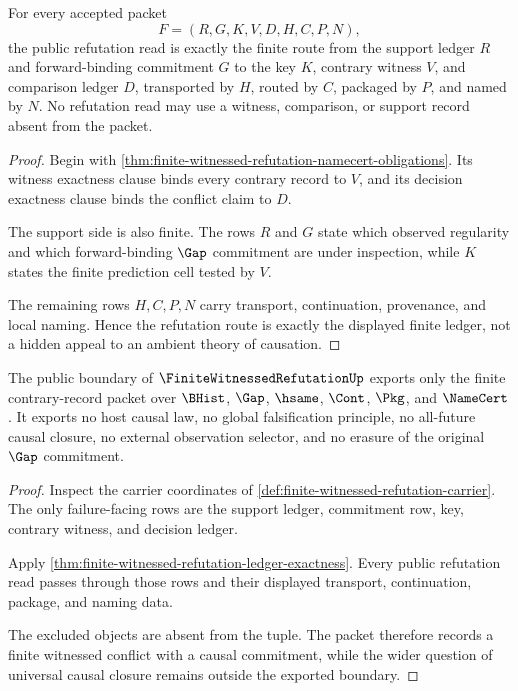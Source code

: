 \begin{theorem}
\label{thm:finite-witnessed-refutation-ledger-exactness}
For every accepted packet
$$
F=(R,G,K,V,D,H,C,P,N),
$$
the public refutation read is exactly the finite route from the support ledger $R$ and forward-binding commitment $G$ to the key $K$, contrary witness $V$, and comparison ledger $D$, transported by $H$, routed by $C$, packaged by $P$, and named by $N$. No refutation read may use a witness, comparison, or support record absent from the packet.
\end{theorem}
\begin{proof}
Begin with \autoref{thm:finite-witnessed-refutation-namecert-obligations}. Its witness exactness clause binds every contrary record to $V$, and its decision exactness clause binds the conflict claim to $D$.

The support side is also finite. The rows $R$ and $G$ state which observed regularity and which forward-binding $\Gap$ commitment are under inspection, while $K$ states the finite prediction cell tested by $V$.

The remaining rows $H,C,P,N$ carry transport, continuation, provenance, and local naming. Hence the refutation route is exactly the displayed finite ledger, not a hidden appeal to an ambient theory of causation.
\end{proof}

\begin{theorem}
\label{thm:finite-witnessed-refutation-non-escape}
The public boundary of $\FiniteWitnessedRefutationUp$ exports only the finite contrary-record packet over $\BHist$, $\Gap$, $\hsame$, $\Cont$, $\Pkg$, and $\NameCert$. It exports no host causal law, no global falsification principle, no all-future causal closure, no external observation selector, and no erasure of the original $\Gap$ commitment.
\end{theorem}
\begin{proof}
Inspect the carrier coordinates of \autoref{def:finite-witnessed-refutation-carrier}. The only failure-facing rows are the support ledger, commitment row, key, contrary witness, and decision ledger.

Apply \autoref{thm:finite-witnessed-refutation-ledger-exactness}. Every public refutation read passes through those rows and their displayed transport, continuation, package, and naming data.

The excluded objects are absent from the tuple. The packet therefore records a finite witnessed conflict with a causal commitment, while the wider question of universal causal closure remains outside the exported boundary.
\end{proof}

